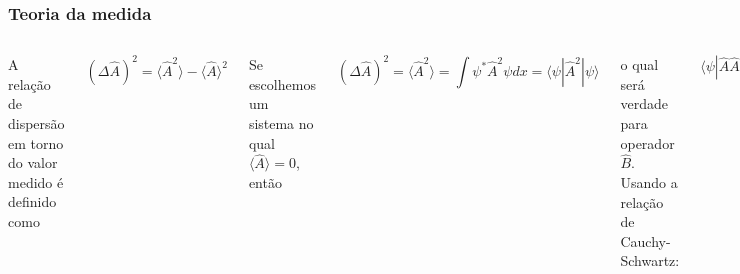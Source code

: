 \documentclass[12pt,brazil,table]{beamer}
\begin{document}
\begin{frame}
  \frametitle{Teoria da medida}
  \fontsize{7pt}{11pt}\selectfont
  
  \setlength{\abovedisplayskip}{-8pt}
  \setlength{\belowdisplayskip}{2pt}
  \setlength{\abovedisplayshortskip}{-8pt}
  \setlength{\belowdisplayshortskip}{2pt}
  
  \begin{columns}[T]

  
  A relação de dispersão em torno do valor medido é definido como
  
  \[
   \left( \Delta \hat{A}\right)^2 = \langle \hat{A}^2 \rangle - \langle \hat{A} \rangle^2
  \]

  Se escolhemos um sistema no qual $\langle \hat{A} \rangle=0$, então
  
  \[
   \left( \Delta \hat{A}\right)^2 = \langle \hat{A}^2 \rangle = \int\psi^*\hat{A}^2\psi dx =\langle\psi|\hat{A}^2|\psi\rangle
  \]
  
  o qual será verdade para operador $\hat{B}$. Usando a relação de Cauchy-Schwartz:
  
  \[
   \langle\psi|\hat{A}\hat{A}|\psi\rangle\langle\psi|\hat{B}\hat{B}|\psi\rangle \geqslant |\langle\psi|\hat{A}\hat{B}|\psi\rangle|^2
  \]

  do qual
  
  \[
  ({\Delta\hat{A}})^2({\Delta\hat{B}})^2 \geqslant |\langle\psi|\hat{A}\hat{B}|\psi\rangle|^2
  \]
  
  Agora, podemos reduzir o termo à direita
  
  \begin{align*}
    |\langle\psi|\hat{A}\hat{B}|\psi\rangle| & \geqslant  |Im\Big[\langle\psi|\hat{A}\hat{B}|\psi\rangle  \Big]\\
    & \geqslant \Big|\frac{1}{2i}\Big[\langle\psi|\hat{A}\hat{B}|\psi\rangle - \langle\psi|\hat{A}\hat{B}|\psi\rangle^*  \Big]\Big|
  \end{align*}

  já que o módulo de um número complexo é maior que sua parte imaginária. Além disso,
  
  \[
   f= Re(f)+i Im(f) \Rightarrow Im(f)=\frac{1}{2i}(f-f^*)
  \]

  

\end{columns}
\end{frame}
\end{document}
